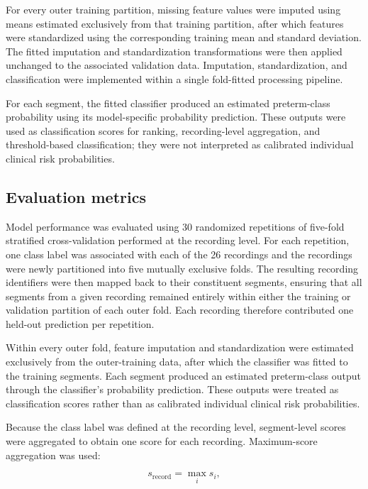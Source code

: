 \documentclass[10pt,letterpaper]{article}
\begin{document}
For every outer training partition, missing feature values were imputed using means estimated exclusively from that training partition, after which features were standardized using the corresponding training mean and standard deviation. The fitted imputation and standardization transformations were then applied unchanged to the associated validation data. Imputation, standardization, and classification were implemented within a single fold-fitted processing pipeline.

For each segment, the fitted classifier produced an estimated preterm-class probability using its model-specific probability prediction. These outputs were used as classification scores for ranking, recording-level aggregation, and threshold-based classification; they were not interpreted as calibrated individual clinical risk probabilities.

\subsection*{Evaluation metrics}

Model performance was evaluated using 30 randomized repetitions of five-fold stratified cross-validation performed at the recording level. For each repetition, one class label was associated with each of the 26 recordings and the recordings were newly partitioned into five mutually exclusive folds. The resulting recording identifiers were then mapped back to their constituent segments, ensuring that all segments from a given recording remained entirely within either the training or validation partition of each outer fold. Each recording therefore contributed one held-out prediction per repetition.

Within every outer fold, feature imputation and standardization were estimated exclusively from the outer-training data, after which the classifier was fitted to the training segments. Each segment produced an estimated preterm-class output through the classifier's probability prediction. These outputs were treated as classification scores rather than as calibrated individual clinical risk probabilities.

Because the class label was defined at the recording level, segment-level scores were aggregated to obtain one score for each recording. Maximum-score aggregation was used:

\begin{equation}
s_{\mathrm{record}}
=
\max_i s_i,
\label{eq:record_aggregation}
\end{equation}
\end{document}
